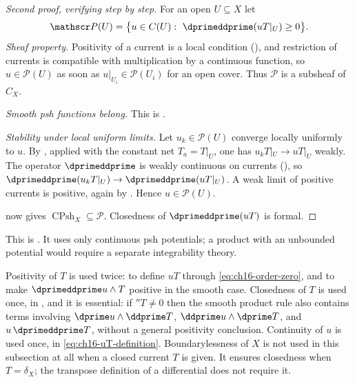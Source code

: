 \begin{proof}[Second proof, verifying
 step by step]
For an open $U\subseteq X$ let
\[
 \mathscr P(U)=\bigl\{u\in C(U):\ \dprimeddprime(uT|_U)\geq0\bigr\}.
\]
\emph{Sheaf property.}  Positivity of a current is a local condition
(), and restriction of currents is
compatible with multiplication by a continuous function, so $u\in\mathscr
P(U)$ as soon as $u|_{U_i}\in\mathscr P(U_i)$ for an open cover.  Thus
$\mathscr P$ is a subsheaf of $C_X$.

\emph{Smooth psh functions belong.}  This is
.

\emph{Stability under local uniform limits.}  Let $u_k\in\mathscr P(U)$
converge locally uniformly to $u$.  By
, applied with the constant net
$T_a=T|_U$, one has $u_kT|_U\to uT|_U$ weakly.  The operator
$\dprimeddprime$ is weakly continuous on currents
(), so
$\dprimeddprime(u_kT|_U)\to\dprimeddprime(uT|_U)$.  A weak limit of positive
currents is positive, again by
.  Hence $u\in\mathscr P(U)$.

 now gives
$\operatorname{CPsh}_X\subseteq\mathscr P$.  Closedness of
$\dprimeddprime(uT)$ is formal.
\end{proof}

This is \cite[Lemma~8.5.5]{CLD25}.  It uses only
continuous psh potentials; a product with an unbounded potential would
require a separate integrability theory.

\begin{remark}
\label{rem:ch16-hypothesis-audit}
Positivity of $T$ is used twice: to define $uT$ through
\eqref{eq:ch16-order-zero}, and to make $\dprimeddprime u\wedge T$ positive
in the smooth case.  Closedness of $T$ is used once, in
, and it is essential: if $\dprime T\neq0$
then the smooth product rule also contains terms involving
$\dprime u\wedge\ddprime T$, $\ddprime u\wedge\dprime T$, and
$u\,\dprimeddprime T$, without a general positivity conclusion.  Continuity of $u$ is used once, in
\eqref{eq:ch16-uT-definition}.  Boundarylessness of $X$ is not used in this
subsection at all when a closed current $T$ is given.  It ensures
closedness when $T=\delta_X$; the transpose definition of a differential
does not require it.
\end{remark}

